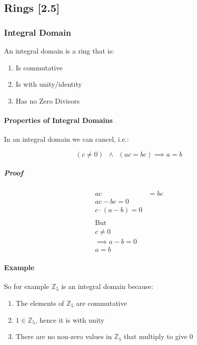 \documentclass[
]{article}
\begin{document}
\hypertarget{header-n858}{%
\subsection{Rings {[}2.5{]}}\label{header-n858}}

\hypertarget{header-n860}{%
\subsubsection{Integral Domain}\label{header-n860}}

An integral domain is a ring that is:

\begin{enumerate}
\def\labelenumi{\arabic{enumi}.}
\item
  Is commutative
\item
  Is with unity/identity
\item
  Has no Zero Divisors
\end{enumerate}

\hypertarget{header-n869}{%
\paragraph{Properties of Integral Domains}\label{header-n869}}

In an integral domain we can cancel, i.e.:

\[(c \neq 0) \enspace \wedge \enspace (ac = bc) \implies a = b\]

\hypertarget{header-n872}{%
\subparagraph{Proof}\label{header-n872}}

\begin{align}
ac &= bc \\
ac - bc = 0 \\
c\cdot (a-b) = 0 \\
\ \\
\text{But} \\
c\neq 0 \\
\implies a - b = 0 \\
a=b
\end{align}

\hypertarget{header-n874}{%
\paragraph{Example}\label{header-n874}}

So for example \(\mathbb{Z}_5\) is an integral domain because:

\begin{enumerate}
\def\labelenumi{\arabic{enumi}.}
\item
  The elements of \(\mathbb{Z}_5\) are commutative
\item
  \(1 \in \mathbb{Z}_5\), hence it is with unity
\item
  There are no non-zero values in \(\mathbb{Z}_5\) that multiply to give
  0
\end{enumerate}
\end{document}
